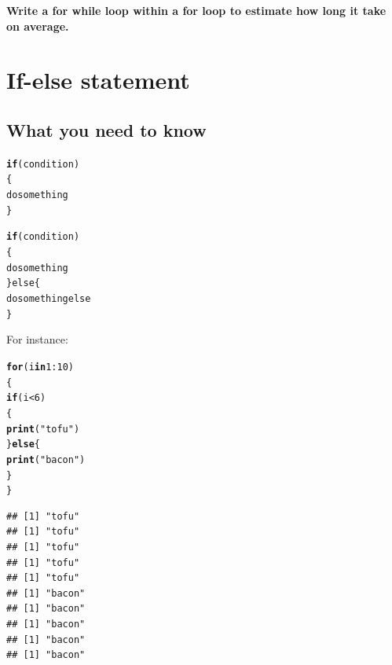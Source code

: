 \documentclass[12pt,a4paper]{scrartcl}\usepackage[]{graphicx}\usepackage[]{color}
\makeatletter
\newcommand{\hlnum}[1]{\textcolor[rgb]{0.686,0.059,0.569}{#1}}%
\newcommand{\hlstr}[1]{\textcolor[rgb]{0.192,0.494,0.8}{#1}}%
\newcommand{\hlopt}[1]{\textcolor[rgb]{0,0,0}{#1}}%
\newcommand{\hlstd}[1]{\textcolor[rgb]{0.345,0.345,0.345}{#1}}%
\newcommand{\hlkwa}[1]{\textcolor[rgb]{0.161,0.373,0.58}{\textbf{#1}}}%
\newcommand{\hlkwd}[1]{\textcolor[rgb]{0.737,0.353,0.396}{\textbf{#1}}}%
\newenvironment{kframe}{%
 \def\at@end@of@kframe{}%
 \ifinner\ifhmode%
  \def\at@end@of@kframe{\end{minipage}}%
  \begin{minipage}{\columnwidth}%
 \fi\fi%
 \def\FrameCommand##1{\hskip\@totalleftmargin \hskip-\fboxsep
 \colorbox{shadecolor}{##1}\hskip-\fboxsep
     \hskip-\linewidth \hskip-\@totalleftmargin \hskip\columnwidth}%
 \MakeFramed {\advance\hsize-\width
   \@totalleftmargin\z@ \linewidth\hsize
   \@setminipage}}%
 {\par\unskip\endMakeFramed%
 \at@end@of@kframe}
\newenvironment{knitrout}{}{} %
\makeatother
\begin{document}
\begin{Exercise}[difficulty=3]
\textbf{Write a for while loop within a for loop to estimate how long it take on average.}
\end{Exercise}

\section{If-else statement}

\subsection{What you need to know}

\begin{knitrout}
\color{fgcolor}\begin{kframe}
\begin{alltt}
\hlkwd{if}(condition)
\{
  do something
\}
\end{alltt}
\end{kframe}
\end{knitrout}


\begin{knitrout}
\color{fgcolor}\begin{kframe}
\begin{alltt}
\hlkwd{if}(condition)
\{
  do something
\}else\{
  do something else
\}
\end{alltt}
\end{kframe}
\end{knitrout}


For instance:
\begin{knitrout}
\color{fgcolor}\begin{kframe}
\begin{alltt}
\hlkwa{for} \hlstd{(i} \hlkwa{in} \hlnum{1}\hlopt{:}\hlnum{10}\hlstd{)}
\hlstd{\{}
  \hlkwa{if}\hlstd{(i} \hlopt{<} \hlnum{6}\hlstd{)}
  \hlstd{\{}
    \hlkwd{print}\hlstd{(}\hlstr{"tofu"}\hlstd{)}
  \hlstd{\}}\hlkwa{else}\hlstd{\{}
    \hlkwd{print}\hlstd{(}\hlstr{"bacon"}\hlstd{)}
  \hlstd{\}}
\hlstd{\}}
\end{alltt}
\begin{verbatim}
## [1] "tofu"
## [1] "tofu"
## [1] "tofu"
## [1] "tofu"
## [1] "tofu"
## [1] "bacon"
## [1] "bacon"
## [1] "bacon"
## [1] "bacon"
## [1] "bacon"
\end{verbatim}
\end{kframe}
\end{knitrout}
\end{document}

